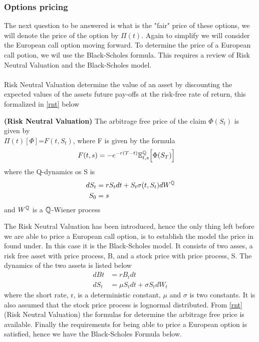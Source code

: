 \subsubsection{Options pricing}
The next question to be answered is what is the "fair" price of these options, we will denote the price of
the option by $\Pi(t)$. Again to simplify we will consider
the European call option moving forward. To determine the price of a European call potion, we wil use the 
Black-Scholes formula. This requires a review of Risk Neutral Valuation and the Black-Scholes model.
\\\\
Risk Neutral Valuation determine the value of an asset by discounting the expected values of the assets future 
pay-offs at the risk-free rate of return, this formalized in \autoref{rnt} below
\begin{theorem}
    \textbf{(Risk Neutral Valuation)} The arbitrage free price of the claim $\Phi(S_t)$ is given by \\
    $\Pi(t)[\Phi]$=$F(t,S_t)$, where F is given by the formula 
    \begin{align*}
        F(t,s) &= -e^{-r(T-t)} \mathbb{E}_{t,s}^{\mathbb{Q}} \Big[\Phi(S_T)\Big]
    \end{align*}
    where the Q-dynamics os S is
    \begin{align*}
        dS_t & = r S_t dt + S_t \sigma(t,S_t) dW^{\mathbb{Q}} \\
        S_0 & = s
    \end{align*}
    and $W^{\mathbb{Q}}$ is a $\mathbb{Q}$-Wiener process \cite{Bjork}
    \label{rnt}
\end{theorem}
\noindent 
The Risk Neutral Valuation has been introduced, hence the only thing left before we are able to price a 
European call option, is to establish the model the price in found under. In this case it is the Black-Scholes model.
It consists of two asses, a risk free asset with price process, B, and a stock price with price process, S.
The dynamics of the two assets is listed below
\begin{align*}
    dBt & = rB_t dt \\
    dS_t &= \mu S_t dt + \sigma S_t dW_t
\end{align*}
where the short rate, r, is  a deterministic constant,  $\mu$ and $\sigma$ is two constants. It is also assumed
that the stock price process is lognormal distributed. From \autoref{rnt}
(Risk Neutral Valuation) the formulas for determine the arbitrage free price is available. Finally the requirements
for being able to price a European option is satisfied, hence we have the Black-Scholes Formula below.
